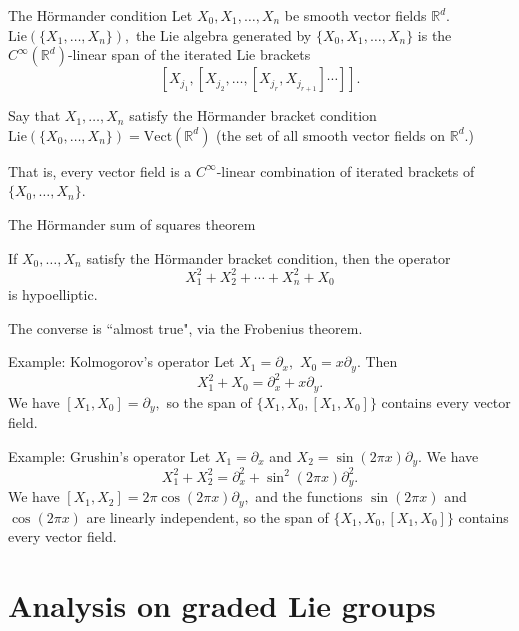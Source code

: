 \documentclass{beamer}
\numberwithin{equation}{section}
\theoremstyle{plain}
\theoremstyle{plain}
\theoremstyle{definition}
\theoremstyle{plain}
\theoremstyle{plain}
\theoremstyle{definition}
\newcommand{\Rl}{\mathbb{R}}
\begin{document}
\begin{frame}{The H\"ormander condition}
    Let $X_0, X_1,\ldots,X_n$ be smooth vector fields $\Rl^d.$ $\mathrm{Lie}(\{X_1,\ldots,X_n\}),$ the Lie algebra generated by $\{X_0,X_1,\ldots,X_n\}$ is the $C^{\infty}(\Rl^d)$-linear span of the iterated Lie brackets
    \[
        [X_{j_1},[X_{j_2},\ldots,[X_{j_r},X_{j_{r+1}}]\cdots]].
    \]
    \begin{definition}
        Say that $X_1,\ldots,X_n$ satisfy the H\"ormander bracket condition $\mathrm{Lie}(\{X_0,\ldots,X_n\}) = \mathrm{Vect}(\Rl^d)$ (the set of all smooth vector fields on $\Rl^d$.)

        That is, every vector field is a $C^{\infty}$-linear combination of iterated brackets of $\{X_0,\ldots,X_n\}.$
    \end{definition}
\end{frame}

\begin{frame}{The H\"ormander sum of squares theorem}
    \begin{theorem}
        If $X_0,\ldots,X_n$ satisfy the H\"ormander bracket condition, then the operator
        \[
            X_1^2+X_2^2+\cdots+X_n^2+X_0
        \]
        is hypoelliptic.
    \end{theorem}
    The converse is ``almost true", via the Frobenius theorem.
\end{frame}

\begin{frame}{Example: Kolmogorov's operator}
    Let $X_1 = \partial_x,$ $X_0 = x\partial_y.$ Then
    \[
        X_1^2+X_0 = \partial_x^2+x\partial_y.
    \]
    We have $[X_1,X_0]=\partial_y,$ so the span of $\{X_1,X_0,[X_1,X_0]\}$ contains every vector field.
\end{frame}

\begin{frame}{Example: Grushin's operator}
    Let $X_1 = \partial_x$ and $X_2 = \sin(2\pi x)\partial_y.$ We have
    \[
        X_1^2+X_2^2 = \partial_x^2+\sin^2(2\pi x)\partial_y^2.
    \]
    We have $[X_1,X_2] = 2\pi\cos(2\pi x)\partial_y,$ and the functions $\sin(2\pi x)$ and $\cos(2\pi x)$ are linearly independent, so the span of $\{X_1,X_0,[X_1,X_0]\}$ contains every vector field.
\end{frame}

\section{Analysis on graded Lie groups}\label{nilpotent_lie_groups_section}
\end{document}
